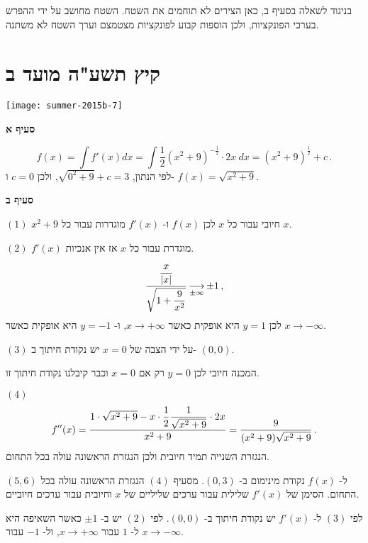 בניגוד לשאלה בסעיף ב, כאן הצירים לא תוחמים את השטח. השטח מחושב על ידי ההפרש בערכי הפונקציות, ולכן הוספות קבוע לפונקציות מצטמצם וערך השטח לא משתנה.


\np


\section{קיץ תשע"ה מועד ב}

\begin{center}
\texttt{[image: summer-2015b-7]}
\end{center}

\vspace{-2ex}

\textbf{סעיף א}

\[
f(x)=\int f'(x) dx = \int \frac{1}{2}(x^2+9)^{-\frac{1}{2}}\cdot 2x\: dx = (x^2+9)^{\frac{1}{2}} +c\,.
\]
לפי הנתון,
$\sqrt{0^2+9}+c=3$,
ולכן
$c=0$
ו-%
$f(x) = \sqrt{x^2+9}$.

\textbf{סעיף ב}

$(1)$
$x^2+9$
חיובי עבור כל 
$x$
לכן
$f(x)$
ו-%
$f'(x)$
מוגדרות עבור כל
$x$.

$(2)$
$f'(x)$
מוגדרת עבור כל 
$x$
אז אין
\asms{}
אנכיות.

\[
\frac{\displaystyle\frac{x}{|x|}}{\sqrt{1+\displaystyle\frac{9}{x^2}}}\mathop{\longrightarrow}\limits_{\pm\infty}\pm 1\,,
\]
לכן 
$y=1$
היא 
\asm{}
אופקית כאשר
$x\rightarrow +\infty$,
ו-%
$y=-1$
היא
\asm{}
אופקית כאשר
$x\rightarrow -\infty$.


$(3)$
על ידי הצבה של
$x=0$
יש נקודת חיתוך ב-%
$(0,0)$.

המכנה חיובי לכן 
$y=0$
רק אם 
$x=0$
וכבר קיבלנו נקודת חיתוך זו.

\np

$(4)$
\[
f''(x)= \frac{1\cdot\sqrt{x^2+9}- x\cdot \displaystyle\frac{1}{2} \displaystyle\frac{1}{\sqrt{x^2+9}}\cdot 2x}{x^2+9}=\frac{9}{(x^2+9)\sqrt{x^2+9}}\,.
\]
הנגזרת השנייה תמיד חיובית ולכן הנגזרת הראשונה עולה בכל התחום.

\smallskip

$(5,6)$
ל-%
$f(x)$
נקודת מינימום ב-%
$(0,3)$.
מסעיף 
$(4)$
הנגזרת הראשונה עולה בכל התחום. הסימן של 
$f'(x)$
שלילית עבור ערכים שליליים של 
$x$
וחיובית עבור ערכים חיוביים.

לפי 
$(3)$
ל-%
$f'(x)$
יש נקודת חיתוך ב-%
$(0,0)$.
לפי 
$(2)$
יש 
\asms{}
ב-%
$\pm 1$
כאשר השאיפה היא ל-%
$1$
עבור 
$x\rightarrow +\infty$,
ול-%
$-1$
עבור 
$x\rightarrow -\infty$.

